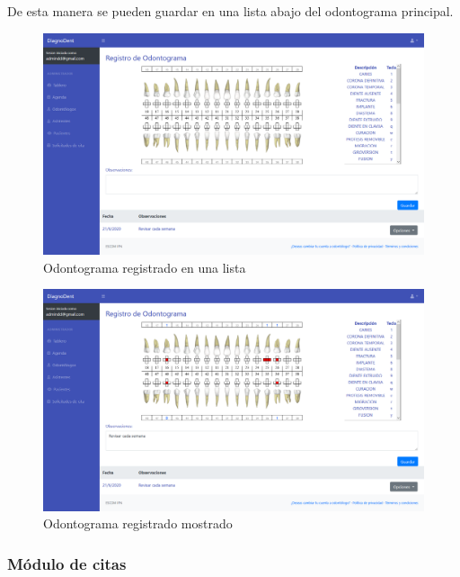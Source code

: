 De esta manera se pueden guardar en una lista abajo del odontograma principal.

\begin{figure}[H]
\centering
\includegraphics[width=17cm,keepaspectratio]{pictures/adminodo/pacientes/odontograma/mu-lista-odontograma-registrado.png}
\caption{Odontograma registrado en una lista}
\end{figure}

\begin{figure}[H]
\centering
\includegraphics[width=17cm,keepaspectratio]{pictures/adminodo/pacientes/odontograma/mu-lista-odontograma-registrado-mostrado.png}
\caption{Odontograma registrado mostrado}
\end{figure}







\subsubsection{Módulo de citas}

